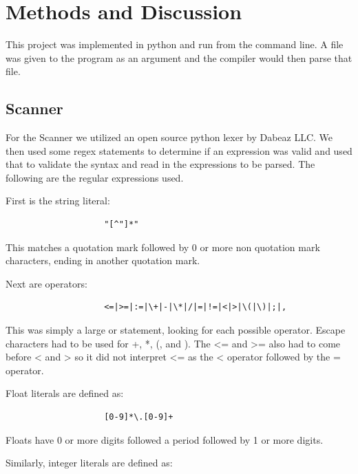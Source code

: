 \documentclass[12pt]{article}
\begin{document}
    \section{Methods and Discussion}
    
    			This project was implemented in python and run from the command line.  A file was given to the program as an argument and the compiler would then parse that file.
    
    	\subsection{Scanner}
    			For the Scanner we utilized an open source python lexer by Dabeaz LLC.  We then used some regex statements to determine if an expression was valid and used that to validate the syntax and read in the expressions to be parsed. The following are the regular expressions used.

                First is the string literal:

                \begin{verbatim}
                    "[^"]*"
                \end{verbatim}

                This matches a quotation mark followed by 0 or more non quotation mark characters, ending in another quotation mark.

                Next are operators:

                \begin{verbatim}
                    <=|>=|:=|\+|-|\*|/|=|!=|<|>|\(|\)|;|,
                \end{verbatim}

                This was simply a large or statement, looking for each possible operator. Escape characters had to be used for +, *, (, and ). The <= and >= also had to come before < and > so it did not interpret <= as the < operator followed by the = operator.

                Float literals are defined as:

                \begin{verbatim}
                    [0-9]*\.[0-9]+
                \end{verbatim}

                Floats have 0 or more digits followed a period followed by 1 or more digits.

                Similarly, integer literals are defined as: 
\end{document}
